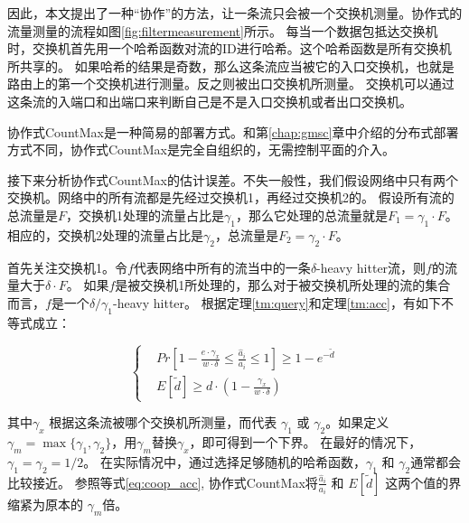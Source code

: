 因此，本文提出了一种“协作”的方法，让一条流只会被一个交换机测量。协作式的流量测量的流程如图\ref{fig:filtermeasurement}所示。
每当一个数据包抵达交换机时，交换机首先用一个哈希函数对流的ID进行哈希。这个哈希函数是所有交换机所共享的。
如果哈希的结果是奇数，那么这条流应当被它的入口交换机，也就是路由上的第一个交换机进行测量。反之则被出口交换机所测量。
交换机可以通过这条流的入端口和出端口来判断自己是不是入口交换机或者出口交换机。

协作式CountMax是一种简易的部署方式。和第\ref{chap:gmsc}章中介绍的分布式部署方式不同，协作式CountMax是完全自组织的，无需控制平面的介入。

接下来分析协作式CountMax的估计误差。不失一般性，我们假设网络中只有两个交换机。网络中的所有流都是先经过交换机1，再经过交换机2的。
假设所有流的总流量是$F$，交换机1处理的流量占比是$\gamma_1 $，那么它处理的总流量就是$F_1 =\gamma_1\cdot F $。
相应的，交换机2处理的流量占比是$\gamma_2 $，总流量是$F_2 =\gamma_2\cdot F $。

首先关注交换机1。令$f$代表网络中所有的流当中的一条$\delta$-heavy hitter流，则$f$的流量大于$\delta \cdot F$。
如果$f$是被交换机1所处理的，那么对于被交换机所处理的流的集合而言，$f$是一个$\delta/\gamma_1$-heavy hitter。
根据定理\ref{tm:query}和定理\ref{tm:acc}，有如下不等式成立：

\begin{equation}\label{eq:coop_acc}
\left\{
\begin{aligned}
&Pr[1-\frac{e\cdot \gamma_x}{w\cdot \delta}\le \frac{\hat{a}_i}{a_i} \le 1] \ge 1-e^{-\tilde{d}}\\
&E[\tilde{d}]\ge d\cdot(1-\frac{\gamma_x}{w\cdot\delta})
\end{aligned}
\right.
\end{equation}

其中$\gamma_x$ 根据这条流被哪个交换机所测量，而代表 $\gamma_1$ 或 $\gamma_2$。如果定义 $\gamma_m = \max \{\gamma_1, \gamma_2\}$，用$\gamma_m$替换$\gamma_x$，即可得到一个下界。
在最好的情况下，$\gamma_1=\gamma_2=1/2$。
在实际情况中，通过选择足够随机的哈希函数，$\gamma_1$ 和 $\gamma_2$通常都会比较接近。
参照等式\eqref{eq:coop_acc}, 协作式CountMax将$\frac{\hat{a}_i}{a_i}$ 和 $E[\tilde{d}]$ 这两个值的界缩紧为原本的 $\gamma_m $倍。
